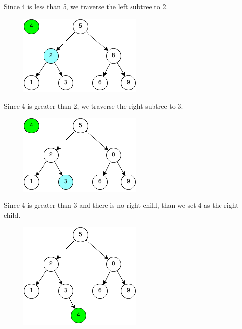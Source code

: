 \documentclass[11pt,oneside]{book}
\makeatletter
\def\maxwidth#1{\ifdim\Gin@nat@width>#1 #1\else\Gin@nat@width\fi}
\makeatother
\begin{document}
Since 4 is less than 5, we traverse the left subtree to 2.

\vspace{5px}\begin{figure}[H]\centering
        \includegraphics[width=0.66\maxwidth{\textwidth}]{bstinsert2.png}
        \end{figure}

Since 4 is greater than 2, we traverse the right subtree to 3.

\vspace{5px}\begin{figure}[H]\centering
        \includegraphics[width=0.66\maxwidth{\textwidth}]{bstinsert3.png}
        \end{figure}

Since 4 is greater than 3 and there is no right child, than we set 4 as the right child.

\vspace{5px}\begin{figure}[H]\centering
        \includegraphics[width=0.66\maxwidth{\textwidth}]{bstinsert4.png}
        \end{figure}
\end{document}
